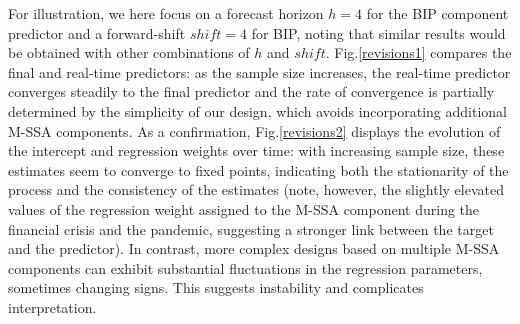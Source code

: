 \documentclass[a4paper]{article}
\begin{document}
For illustration, we here focus on a forecast horizon $h=4$ for the BIP component predictor and a forward-shift $shift=4$ for BIP, noting that similar results would be obtained with other combinations of $h$ and $shift$. 
Fig.\eqref{revisions1} compares the final and real-time predictors: as the sample size increases, the real-time predictor converges steadily to the final predictor and the rate of convergence is partially determined by the simplicity of our design, which avoids incorporating additional M-SSA components. 
As a confirmation, Fig.\eqref{revisions2} displays the evolution of the intercept and regression weights over time: with increasing sample size, these estimates seem to converge to fixed points, indicating both the stationarity of the process and the consistency of the estimates (note, however, the slightly elevated values of the regression weight assigned to the M-SSA component during the financial crisis and the pandemic, suggesting a stronger link between the target and the predictor).  In contrast, more complex designs based on multiple M-SSA components can exhibit substantial fluctuations in the regression parameters, sometimes changing signs. This suggests instability and complicates interpretation.
\end{document}
